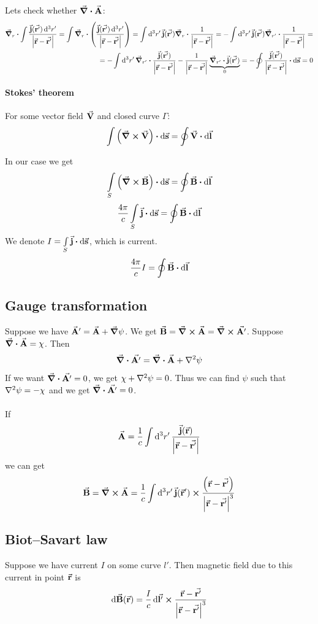 Lets check whether $\div{\va{A}}$:
\begin{align*}
\grad_r \vdot {\int \frac{\va{j} (\va{r'}) \dd[3]{r'}}{\qty|\va{r} -\va{r'}|}} =  \int \grad_r \vdot \qty(\frac{\va{j} (\va{r'}) \dd[3]{r'}}{\qty|\va{r} -\va{r'}|})  = \int \dd[3]{r'}  \va{j} (\va{r'}) \grad_{r} \vdot \frac{1 }{\qty|\va{r} -\va{r'}|} = -\int \dd[3]{r'}  \va{j} (\va{r'}) \grad_{r'} \vdot \frac{1 }{\qty|\va{r} -\va{r'}|} =\\= -\int \dd[3]{r'}  \grad_{r'} \vdot \frac{\va{j} (\va{r'})  }{\qty|\va{r} -\va{r'}|} - \frac{1 }{\qty|\va{r} -\va{r'}|} \underbrace{\grad_{r'} \vdot \va{j} (\va{r'}) }_{0} = - \oint \frac{\va{j} (\va{r'})  }{\qty|\va{r} -\va{r'}|} \vdot \dd{\va{s}} = 0
\end{align*}
\paragraph{Stokes' theorem}
For some vector field $\va{V}$ and closed curve $\Gamma$:
$$\int \qty(\curl{\va{V}}) \vdot \dd{\va{s}} = \oint \va{V} \vdot \dd{\va{l}}$$

In our case we get
$$\int\limits_{S} \qty(\curl{\va{B}}) \vdot \dd{\va{s}} = \oint \va{B} \vdot \dd{\va{l}}$$
$$\frac{4\pi}{c}\int\limits_{S} \va{j} \vdot \dd{\va{s}} = \oint \va{B} \vdot \dd{\va{l}}$$
We denote $I = \int\limits_{S} \va{j} \vdot \dd{\va{s}}$, which is current.
$$\frac{4\pi}{c}I = \oint \va{B} \vdot \dd{\va{l}}$$
\subsection{Gauge transformation}
Suppose we have $\va{A}' = \va{A} + \grad{\psi}$. We get $\va{B} = \curl{\va{A}} = \curl{\va{A'}}$.
Suppose $\div{\va{A}} = \chi$. Then
$$\div{\va{A'}} = \div{\va{A}} + \laplacian{\psi}$$
If we want $\div{\va{A'}} = 0$, we get $\chi + \laplacian{\psi} = 0$. Thus we can find $\psi$ such that $\laplacian{\psi} = -\chi$ and we get $\div{\va{A'}} = 0$.

\paragraph{}
If 
$$\va{A} = \frac{1}{c} \int \dd[3]{r'} \frac{\va{j}(\va{r})}{\abs{\va{r}-\va{r'}}}$$
we can get
$$\va{B} = \curl{\va{A}} = \frac{1}{c} \int \dd[3]{r'} \va{j}(\va{r}') \cross \frac{\qty(\va{r}-\va{r'})}{\abs{\va{r}-\va{r'}}^3}$$
\subsection{Biot–Savart law}
Suppose we have current $I$ on some curve $l'$. Then magnetic field due to this current in point $\va{r}$ is
$$\dd{\va{B}(\va{r})} = \frac{I}{c} \dd{\va{l'}} \cross \frac{\va{r}-\va{r'}}{\abs{\va{r}-\va{r'}}^3}$$
